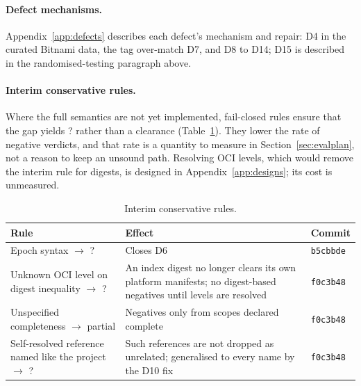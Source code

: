\documentclass[11pt,a4paper]{article}
\newcommand{\code}[1]{\texttt{#1}}
\newcommand{\Ind}{\textsf{?}}
\newcommand{\dsixcommit}{\code{b5cbbde}}
\newcommand{\dfourcommit}{\code{f0c3b48}}
\begin{document}
\paragraph{Defect mechanisms.} Appendix~\ref{app:defects} describes
each defect's mechanism and repair: D4 in the curated Bitnami data,
the tag over-match D7, and D8 to D14; D15 is described in the
randomised-testing paragraph above.

\paragraph{Interim conservative rules.} Where the full semantics are
not yet implemented, fail-closed rules ensure that the gap yields
\Ind{} rather than a clearance (Table~\ref{tab:interim}). They lower
the rate of negative verdicts, and that rate is a quantity to measure
in Section~\ref{sec:evalplan}, not a reason to keep an unsound path.
Resolving OCI levels, which would remove the interim rule for digests,
is designed in Appendix~\ref{app:designs}; its cost is unmeasured.

\begin{table}[t]
\centering
\footnotesize
\begin{tabularx}{\linewidth}{@{}>{\raggedright\arraybackslash}X >{\raggedright\arraybackslash}p{4.6cm} l@{}}
\toprule
Rule & Effect & Commit \\
\midrule
Epoch syntax $\to$ \Ind{} & Closes D6 & \dsixcommit{} \\
Unknown OCI level on digest inequality $\to$ \Ind{} & An index digest no
  longer clears its own platform manifests; no digest-based negatives
  until levels are resolved & \dfourcommit{} \\
Unspecified completeness $\to$ partial & Negatives only from scopes
  declared complete & \dfourcommit{} \\
Self-resolved reference named like the project $\to$ \Ind{} & Such
  references are not dropped as unrelated; generalised to every name
  by the D10 fix & \dfourcommit{} \\
\bottomrule
\end{tabularx}
\caption{Interim conservative rules.}
\label{tab:interim}
\end{table}
\end{document}
